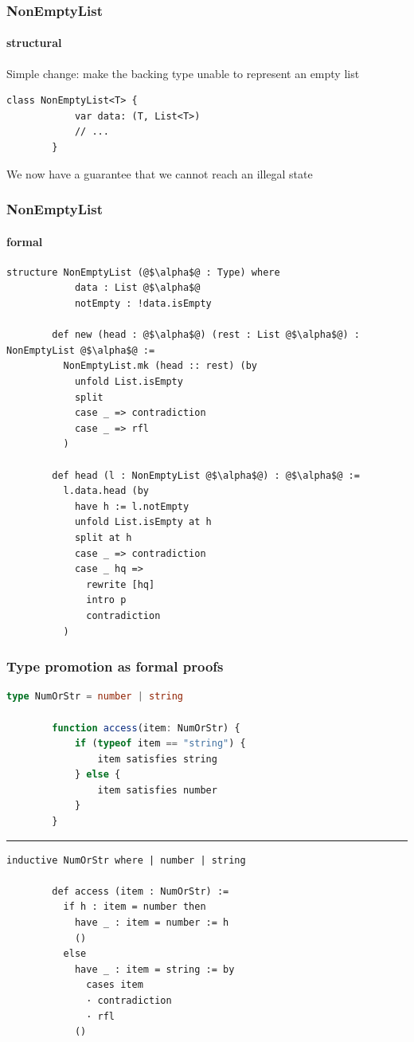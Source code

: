 \documentclass[compress,12pt,xcolor={dvipsnames}]{beamer}
\begin{document}
\begin{frame}[fragile]
    \frametitle{NonEmptyList}
    \framesubtitle{structural}
    Simple change: make the backing type unable to represent an empty list
    \begin{lstlisting}[language=Oop,gobble=8,basicstyle=\tt\scriptsize]
        class NonEmptyList<T> {
            var data: (T, List<T>)
            // ...
        }
    \end{lstlisting}
    We now have a guarantee that we cannot reach an illegal state
\end{frame}

\begin{frame}[fragile]
    \frametitle{NonEmptyList}
    \framesubtitle{formal}
    \begin{lstlisting}[language=lean,gobble=8,basicstyle=\tt\scriptsize]
        structure NonEmptyList (@$\alpha$@ : Type) where
            data : List @$\alpha$@
            notEmpty : !data.isEmpty
        
        def new (head : @$\alpha$@) (rest : List @$\alpha$@) : NonEmptyList @$\alpha$@ :=
          NonEmptyList.mk (head :: rest) (by
            unfold List.isEmpty
            split
            case _ => contradiction
            case _ => rfl
          )
        
        def head (l : NonEmptyList @$\alpha$@) : @$\alpha$@ :=
          l.data.head (by
            have h := l.notEmpty
            unfold List.isEmpty at h
            split at h
            case _ => contradiction
            case _ hq =>
              rewrite [hq]
              intro p
              contradiction
          )
    \end{lstlisting}
\end{frame}

\begin{frame}[fragile]
    \frametitle{Type promotion as formal proofs}
    \begin{lstlisting}[language=typescript,gobble=8,basicstyle=\tt\scriptsize]
        type NumOrStr = number | string

        function access(item: NumOrStr) {
            if (typeof item == "string") {
                item satisfies string
            } else {
                item satisfies number
            }
        }
    \end{lstlisting}
    \hrule
    \begin{lstlisting}[language=lean,gobble=8,basicstyle=\tt\scriptsize]
        inductive NumOrStr where | number | string
        
        def access (item : NumOrStr) :=
          if h : item = number then
            have _ : item = number := h
            ()
          else
            have _ : item = string := by
              cases item
              · contradiction
              · rfl
            ()
    \end{lstlisting}

\end{frame}
\end{document}

